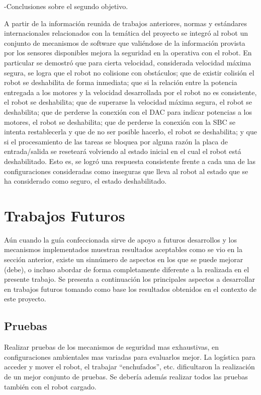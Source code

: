 \documentclass[withindex,glossary]{cam-thesis}
\begin{document}
-Conclusiones sobre el segundo objetivo.

A partir de la información reunida de trabajos anteriores, normas y estándares internacionales relacionados con la temática del proyecto se integró al robot un conjunto de mecanismos de software que valiéndose de la información provista por los sensores disponibles mejora la seguridad en la operativa con el robot. En particular se demostró que para cierta velocidad, considerada velocidad máxima segura, se logra que el robot no colisione con obstáculos; que de existir colisión el robot se deshabilita de forma inmediata; que si la relación entre la potencia entregada a los motores y la velocidad desarrollada por el robot no es consistente, el robot se deshabilita; que de superarse la velocidad máxima segura, el robot se deshabilita; que de perderse la conexión con el DAC para indicar potencias a los motores, el robot se deshabilita; que de perderse la conexión con la SBC se intenta restablecerla y que de no ser posible hacerlo, el robot se deshabilita; y que si el procesamiento de las tareas se bloquea por alguna razón la placa de entrada/salida se reseteará volviendo al estado inicial en el cual el robot está deshabilitado. Esto es, se logró una respuesta consistente frente a cada una de las configuraciones consideradas como inseguras que lleva al robot al estado que se ha considerado como seguro, el estado deshabilitado.

\section{Trabajos Futuros}
Aún cuando la guía confeccionada sirve de apoyo a futuros desarrollos y los mecanismos implementados muestran resultados aceptables como se vio en la sección anterior, existe un sinnúmero de aspectos en los que se puede mejorar (debe), o incluso abordar de forma completamente diferente a la realizada en el presente trabajo.
Se presenta a continuación los principales aspectos a desarrollar en trabajos futuros tomando como base los resultados obtenidos en el contexto de este proyecto.

\subsection{Pruebas}
Realizar pruebas de los mecanismos de seguridad mas exhaustivas, en configuraciones ambientales mas variadas para evaluarlos mejor. La logística para acceder y mover el robot, el trabajar ``enchufados'', etc. dificultaron la realización de un mejor conjunto de pruebas. Se debería además realizar todos las pruebas también con el robot cargado.
\end{document}
